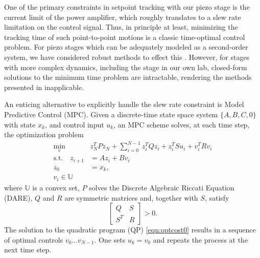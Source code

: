 \documentclass[journal,twocolumn,twoside]{IEEEtran}
\begin{document}

One of the primary constraints in setpoint tracking with our piezo stage is the current limit of the power amplifier,  which roughly translates to a slew rate limitation on the control signal. Thus, 
in principle at least, minimizing the tracking time of such point-to-point motions is a classic time-optimal control problem. For piezo stages which can be adequately modeled as a second-order system, we have considered robust methods to effect this \cite{braker_proximate_2017}. However, for stages with more complex dynamics,  including the stage in our own lab, closed-form solutions to the minimum time problem are intractable, rendering the methods presented in \cite{braker_proximate_2017} inapplicable.


An enticing alternative to explicitly handle the slew rate constraint is Model Predictive Control (MPC).
Given a discrete-time state space system $\{A,B,C,0\}$ with state $x_k$, and control input $u_k$, an MPC scheme solves, at each time step, the optimization problem 
\begin{subequations}
\begin{align}
\min_{v}\:\:& z^T_{N}Pz_{N} + \sum_{i=0}^{N-1}z_{i}^{T}Qz_{i} + z^T_iSu_i + v^{T}_{i}Rv_{i} \\
 \text{s.t.} \quad z_{i+1} &= A z_{i} + B v_{i}\\
z_{0} &= x_{k}, \\
v_i  \in \mathds{U}
\end{align}\label{eqn:optcost0}%
\end{subequations}
where $\mathds{U}$ is a convex set, $P$ solves the Discrete Algebraic Riccati Equation (DARE), $Q$ and $R$ are symmetric matrices and, together with $S$, satisfy
\begin{equation}
  \begin{bmatrix}
    Q & S\\S^T &R
  \end{bmatrix} > 0.
\end{equation}
The solution to the quadratic program (QP) \eqref{eqn:optcost0} results in a sequence of optimal controls $v_0\dots v_{N-1}$. One sets $u_k = v_0$ and repeats the process at the next time step.
\end{document}

